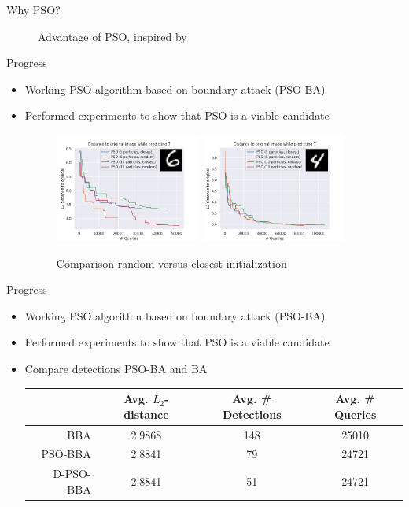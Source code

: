 \documentclass[11pt,t]{beamer}
\begin{document}
\begin{frame}{Why PSO?}
\begin{figure}
{\begin{tikzpicture}[x=0.75pt,y=0.75pt,yscale=-1,xscale=1]
\end{tikzpicture}
}
\caption{Advantage of PSO, inspired by \cite{brendel2018decisionbased}}
\label{fig:pso_advantage_rand}
\end{figure}
\end{frame}

\begin{frame}[plain]{Progress}
\begin{itemize}
	\item Working PSO algorithm based on boundary attack (PSO-BA)
	\item Performed experiments to show that PSO is a viable candidate
	\begin{figure}
	\centering
	\includegraphics[width=0.45\textwidth]{graphics/random_vs_closest.png}
	\includegraphics[width=0.45\textwidth]{graphics/random_vs_closest_1.png}
	\caption{Comparison random versus closest initialization\label{fig:rand_vs_close}}
	\footnotesize
	\flushleft
	\end{figure}
\end{itemize}
\end{frame}

\begin{frame}{Progress}
\begin{itemize}
	\item Working PSO algorithm based on boundary attack (PSO-BA)
	\item Performed experiments to show that PSO is a viable candidate
	\item Compare detections PSO-BA and BA
	\begin{table}
		\begin{tabular}{r|c|c|c}
			& Avg. $L_2$-distance & Avg. \# Detections & Avg. \# Queries \\ \hline
		BBA	& 2.9868 &148 &25010 \\
		PSO-BBA & 2.8841	&79	&24721 \\
		D-PSO-BBA & 2.8841 &51 &24721 \\
		\end{tabular}
	\end{table}
\end{itemize}
\end{frame}
\end{document}

